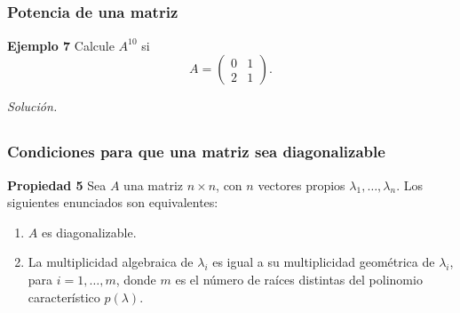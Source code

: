 
\subsection{}

\begin{frame}\frametitle{Potencia de una matriz}
	
	\begin{ej}{\textbf{Ejemplo 7}}
		Calcule $A^{10}$ si
		\[
		A =
		\left(
		\begin{array}{cc}
			0 & 1 \\[1mm]
			2 & 1 
		\end{array}
		\right).
		\]	
	\end{ej}
	\textit{Solución.}
	
\end{frame}


\subsection{}

\begin{frame}\frametitle{Condiciones para que una matriz sea diagonalizable}
	
	\begin{prop}{\textbf{Propiedad 5}}
		\justifying
		Sea $A$ una matriz $n\times n$, con $n$ vectores propios $\lambda_1,\hdots,\lambda_n$.
		Los siguientes enunciados son equivalentes:
		\begin{enumerate}[$a$]\justifying
			\item $A$ es diagonalizable.
			\item La multiplicidad algebraica de $\lambda_i$ es igual a su multiplicidad geométrica de $\lambda_i$,
			para $i=1,\hdots,m$, donde $m$ es el número de raíces distintas del polinomio característico $p(\lambda)$.
		\end{enumerate}
	\end{prop}	
	
	
	
\end{frame}


